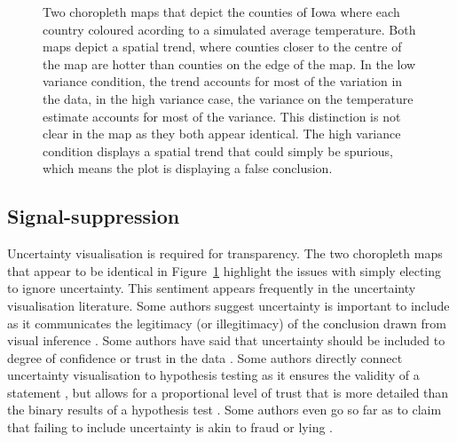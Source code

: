 \documentclass[
  12pt]{article}
\begin{document}
\begin{figure}
\begin{minipage}{0.33\linewidth}
\end{minipage}%
%
\begin{minipage}{0.33\linewidth}



\end{minipage}%

\caption{\label{fig-choropleth}Two choropleth maps that depict the
counties of Iowa where each country coloured acording to a simulated
average temperature. Both maps depict a spatial trend, where counties
closer to the centre of the map are hotter than counties on the edge of
the map. In the low variance condition, the trend accounts for most of
the variation in the data, in the high variance case, the variance on
the temperature estimate accounts for most of the variance. This
distinction is not clear in the map as they both appear identical. The
high variance condition displays a spatial trend that could simply be
spurious, which means the plot is displaying a false conclusion.}

\end{figure}%

\subsection{Signal-suppression}\label{signal-suppression}

Uncertainty visualisation is required for transparency. The two
choropleth maps that appear to be identical in
Figure~\ref{fig-choropleth} highlight the issues with simply electing to
ignore uncertainty. This sentiment appears frequently in the uncertainty
visualisation literature. Some authors suggest uncertainty is important
to include as it communicates the legitimacy (or illegitimacy) of the
conclusion drawn from visual inference
\citep{Correll2014, Kale2018, Griethe2006}. Some authors have said that
uncertainty should be included to degree of confidence or trust in the
data \citep{Boukhelifa2012, Zhao2023}. Some authors directly connect
uncertainty visualisation to hypothesis testing as it ensures the
validity of a statement \citep{Hullman2020a, Griethe2006}, but allows
for a proportional level of trust that is more detailed than the binary
results of a hypothesis test \citep{Correll2014, Correll2018}. Some
authors even go so far as to claim that failing to include uncertainty
is akin to fraud or lying \citep{Hullman2020a, Manski2020}.
\end{document}
